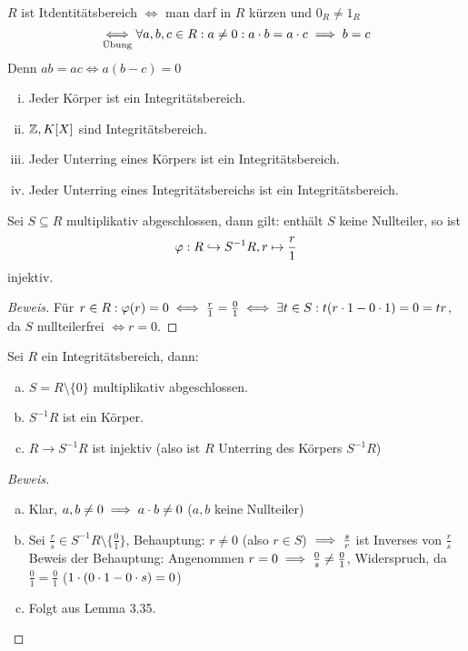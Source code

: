 \documentclass[a4paper]{report}
\begin{document}
\begin{bem}
  $R$ ist Itdentitätsbereich $\iff$ man darf in $R$ kürzen und $0_{R} \ne 1_{R}$
  \[\ueb \iff \forall a, b, c \in R : a \ne 0 : a\cd b = a\cd c \imp b = c\]
  Denn $ab = ac \iff a(b-c) = 0$
\end{bem}
\begin{bsp*}
\begin{enumerate}[(i)]
  \item Jeder Körper ist ein Integritätsbereich.
  \item $\Z, K[X]$ sind Integritätsbereich.
  \item Jeder Unterring eines Körpers ist ein Integritätsbereich.
  \item Jeder Unterring eines Integritätsbereichs ist ein Integritätsbereich.
\end{enumerate}
\end{bsp*}

\begin{lemm}
  Sei $S \subseteq R$ multiplikativ abgeschlossen, dann gilt: enthält $S$ keine Nullteiler, so ist \[\ph : R \hookrightarrow S^{-1}R, r \mps \frac r1\] injektiv.
  \begin{proof}[Beweis]
    Für $r \in R: \ph(r) = 0 \iff \frac r1 = \frac 01 \iff \ex t \in S : t(r \cd 1 - 0\cd 1) = 0 = tr$, da $S$ nullteilerfrei $\iff r = 0.$
  \end{proof}
\end{lemm}

\begin{kor}
  Sei $R$ ein Integritätsbereich, dann:
  \begin{enumerate}[(a)]
    \item $S = R \setminus \{0\}$ multiplikativ abgeschlossen.
    \item $S^{-1}R$ ist ein Körper.
    \item $R \to S^{-1}R$ ist injektiv (also ist $R$ Unterring des Körpers $S^{-1}R$)
  \end{enumerate}
\begin{proof}[Beweis]
  \begin{enumerate}[(a)]
    \item Klar, $a,b \ne 0 \imp a\cd b \ne 0$ ($a,b$ keine Nullteiler)
    \item Sei $\frac rs \in S^{-1}R \setminus \{\frac 01\}$, Behauptung: $r \ne 0$ (also $r \in S$) $\imp \frac sr$ ist Inverses von $\frac rs$
          Beweis der Behauptung: Angenommen $r = 0 \imp \frac 0s \ne \frac 01$, Widerspruch, da $\frac 01 = \frac 01$ ($1 \cd(0\cd1 - 0 \cd s) = 0$)
    \item Folgt aus Lemma 3.35.
  \end{enumerate}

\end{proof}
\end{kor}
\end{document}

